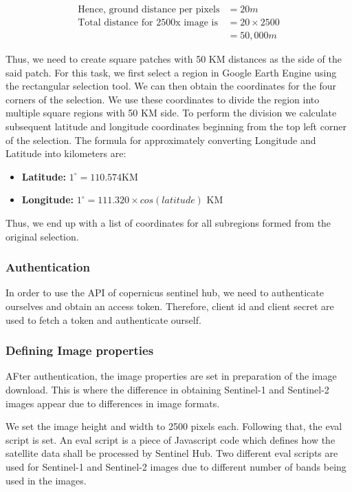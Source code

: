 \begin{align*}
    \text{Hence, ground distance per pixels} &= 20m \\
    \text{Total distance for 2500x image is} &= 20\times2500 \\
    &= 50,000m
\end{align*}

Thus, we need to create square patches with 50 KM distances as the side of the said patch. For this task, we first select a region in Google Earth Engine using the rectangular selection tool. We can then obtain the coordinates for the four corners of the selection. We use these coordinates to divide the region into multiple square regions with 50 KM side. To perform the division we calculate subsequent latitude and longitude coordinates beginning from the top left corner of the selection. The formula for approximately converting Longitude and Latitude into kilometers are:

\begin{itemize}
    \item \textbf{Latitude: } $1^\circ = 110.574$KM
    \item \textbf{Longitude:} $1^\circ = 111.320\times cos(latitude)$ KM
\end{itemize}

Thus, we end up with a list of coordinates for all subregions formed from the original selection.

\subsubsection{Authentication}
In order to use the API of copernicus sentinel hub, we need to authenticate ourselves and obtain an access token. Therefore, client id and client secret are used to fetch a token and authenticate ourself.

\subsubsection{Defining Image properties}
AFter authentication, the image properties are set in preparation of the image download. This is where the difference in obtaining Sentinel-1 and Sentinel-2 images appear due to differences in image formats.

We set the image height and width to 2500 pixels each. Following that, the eval script is set. An eval script is a piece of Javascript code which defines how the satellite data shall be processed by Sentinel Hub\cite{evalDoc}. Two different eval scripts are used for Sentinel-1 and Sentinel-2 images due to different number of bands being used in the images.

